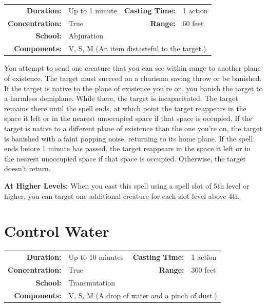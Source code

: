 \documentclass[12pt,showtrims]{memoir}
\begin{document}
{
\small\centering\vspace{-6pt}
\begin{tabular}{rlrl}
\toprule

\textbf{Duration:} & Up to 1 minute &
\textbf{Casting Time:} & 1 action \\
\textbf{Concentration:} & True &
\textbf{Range:} & 60 feet \\
\textbf{School:} & Abjuration \\
\textbf{Components:} & \multicolumn{3}{p{0.7\textwidth}}{V, S, M (An item distasteful to the target.)}\\

\bottomrule
\end{tabular}
}

\vspace{1\baselineskip}\noindent You attempt to send one creature that you can see within range to another plane of existence. The target must succeed on a charisma saving throw or be banished. If the target is native to the plane of existence you're on, you banish the target to a harmless demiplane. While there, the target is incapacitated. The target remains there until the spell ends, at which point the target reappears in the space it left or in the nearest unoccupied space if that space is occupied. If the target is native to a different plane of existence than the one you're on, the target is banished with a faint popping noise, returning to its home plane. If the spell ends before 1 minute has passed, the target reappears in the space it left or in the nearest unoccupied space if that space is occupied. Otherwise, the target doesn't return.

\vspace{8pt} \noindent\textbf{At Higher Levels:} When you cast this spell using a spell slot of 5th level or higher, you can target one additional creature for each slot level above 4th.
\newpage
\section*{Control Water}

{
\small\centering\vspace{-6pt}
\begin{tabular}{rlrl}
\toprule

\textbf{Duration:} & Up to 10 minutes &
\textbf{Casting Time:} & 1 action \\
\textbf{Concentration:} & True &
\textbf{Range:} & 300 feet \\
\textbf{School:} & Transmutation \\
\textbf{Components:} & \multicolumn{3}{p{0.7\textwidth}}{V, S, M (A drop of water and a pinch of dust.)}\\

\bottomrule
\end{tabular}
}
\end{document}
